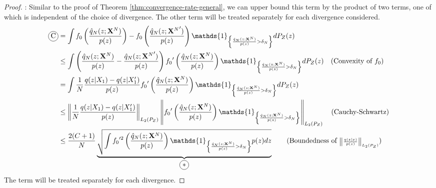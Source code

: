 \begin{proof}
: Similar to the proof of Theorem \ref{thm:convergence-rate-general}, we can upper bound this term by the product of two terms, one of which is independent of the choice of divergence.
The other term will be treated separately for each divergence considered.
%
%
\begin{align*}
    \encircle{C} &= \int {f_0}\left( \frac{\hat{q}_N(z;\XN)}{p(z)}\right) - {f_0}\left( \frac{\hat{q}_N(z;{\XN}')}{p(z)} \right) \mathds{1}_{\left\lbrace \frac{\hat{q}_N(z;\XN)}{p(z)} > \delta_N \right\rbrace} dP_Z(z) \\
    &\leq \int \left(\frac{\hat{q}_N(z;\XN)}{p(z)} - \frac{\hat{q}_N(z;{\XN}')}{p(z)}\right) {f_0}'\left(\frac{\hat{q}_N(z;\XN)}{p(z)} \right) \mathds{1}_{\left\lbrace \frac{\hat{q}_N(z;\XN)}{p(z)} > \delta_N \right\rbrace} dP_Z(z) 
    \quad \text{(Convexity of ${f_0}$)}
    \\
    &= \int \frac{1}{N}\frac{q(z|X_1) - q(z|X'_1)}{p(z)}  {f_0}'\left(\frac{\hat{q}_N(z;\XN)}{p(z)} \right) \mathds{1}_{\left\lbrace \frac{\hat{q}_N(z;\XN)}{p(z)} > \delta_N \right\rbrace} dP_Z(z) \\
    &\leq \left\| \frac{1}{N}\frac{q(z|X_1) - q(z|X'_1)}{p(z)}\right\|_{L_2(P_Z)}
    \left\| {f_0}'\left(\frac{\hat{q}_N(z;\XN)}{p(z)} \right) \mathds{1}_{\left\lbrace \frac{\hat{q}_N(z;\XN)}{p(z)} > \delta_N \right\rbrace} \right\|_{L_2(P_Z)} 
    \quad \text{(Cauchy-Schwartz)}
    \\
    &\leq \frac{2(C+1)}{N} \underbrace{\sqrt{\int {f_0}'^2\left(\frac{\hat{q}_N(z;\XN)}{p(z)} \right) \mathds{1}_{\left\lbrace \frac{\hat{q}_N(z;\XN)}{p(z)} > \delta_N \right\rbrace} p(z) dz }}_{\encircle{$*$}}
    \qquad \text{(Boundedness of ${\scriptscriptstyle\left\| \frac{q(z|x)}{p(z)}\right\|_{L_2(P_Z)}}$)}
\end{align*}
The term \encircle{$*$} will be treated separately for each divergence.
%

\end{proof}
